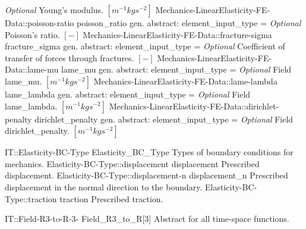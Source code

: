 \begin{RecordType}
			{ \it{Optional}}
			{{{Young's modulus. }{$[m^{-1}kgs^{-2}]$}%
}}
		\RecKey
			{Mechanics-LinearElasticity-FE-Data::poisson-ratio}
			{poisson{\_}ratio}
			{{gen. abstract: }}{{element{\_}input{\_}type}{ = }}
			{ \it{Optional}}
			{{{Poisson's ratio. }{$[-]$}%
}}
		\RecKey
			{Mechanics-LinearElasticity-FE-Data::fracture-sigma}
			{fracture{\_}sigma}
			{{gen. abstract: }}{{element{\_}input{\_}type}{ = }}
			{ \it{Optional}}
			{{{Coefficient of transfer of forces through fractures. }{$[-]$}%
}}
		\RecKey
			{Mechanics-LinearElasticity-FE-Data::lame-mu}
			{lame{\_}mu}
			{{gen. abstract: }}{{element{\_}input{\_}type}{ = }}
			{ \it{Optional}}
			{{{Field lame{\_}mu. }{$[m^{-1}kgs^{-2}]$}%
}}
		\RecKey
			{Mechanics-LinearElasticity-FE-Data::lame-lambda}
			{lame{\_}lambda}
			{{gen. abstract: }}{{element{\_}input{\_}type}{ = }}
			{ \it{Optional}}
			{{{Field lame{\_}lambda. }{$[m^{-1}kgs^{-2}]$}%
}}
		\RecKey
			{Mechanics-LinearElasticity-FE-Data::dirichlet-penalty}
			{dirichlet{\_}penalty}
			{{gen. abstract: }}{{element{\_}input{\_}type}{ = }}
			{ \it{Optional}}
			{{{Field dirichlet{\_}penalty. }{$[m^{-1}kgs^{-2}]$}%
}}
\end{RecordType}
\begin{SelectionType}
	{IT::Elasticity-BC-Type}
	{Elasticity{\_}BC{\_}Type}
	{{{Types of boundary conditions for mechanics.}%
}}
		\SelectionItem
			{Elasticity-BC-Type::displacement}
			{displacement}
			{{{Prescribed displacement.}%
}}
		\SelectionItem
			{Elasticity-BC-Type::displacement-n}
			{displacement{\_}n}
			{{{Prescribed displacement in the normal direction to the boundary.}%
}}
		\SelectionItem
			{Elasticity-BC-Type::traction}
			{traction}
			{{{Prescribed traction.}%
}}
\end{SelectionType}
\begin{AbstractType}
	{IT::Field-R3-to-R-3-}
	{Field{\_}R3{\_}to{\_}R[3]}
	{}
	{{{Abstract for all time-space functions.}%
}}
\end{AbstractType}
